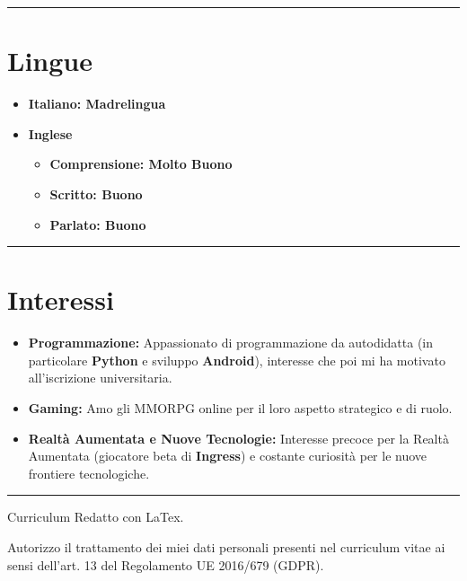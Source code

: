 \documentclass{article}
\begin{document}
\hrule

\section*{\large{Lingue}}
	\begin{itemize}
	  \item {\normalsize{\textbf{Italiano: Madrelingua}}}
	  \vspace {0.2cm}
	  \item {\normalsize{\textbf{Inglese}}}
	  \begin{itemize}
	    \item {\normalsize{\textbf{Comprensione: Molto Buono}}}
	    \item {\normalsize{\textbf{Scritto: Buono}}}
	    \item {\normalsize{\textbf{Parlato: Buono}}}
	    \end{itemize}
	\end{itemize}
	
\hrule

\section*{\large{Interessi}}
	\begin{itemize}
	\item {\normalsize{\textbf{Programmazione:} Appassionato di programmazione da autodidatta (in particolare \textbf{Python}
	e sviluppo \textbf{Android}), interesse che poi mi ha motivato all'iscrizione universitaria.}}
  	\item {\normalsize{\textbf{Gaming:} Amo gli MMORPG online per il loro aspetto strategico e di ruolo.}}
  	\item {\normalsize{\textbf{Realtà Aumentata e Nuove Tecnologie:} Interesse precoce per la Realtà Aumentata
  	(giocatore beta di \textbf{Ingress}) e costante curiosità per le nuove frontiere tecnologiche.}}
	\end{itemize}

\hrule

\vspace{0.2cm}
\normalsize
\begin{center}
Curriculum Redatto con LaTex.
\end{center}

\vspace{1cm}
\normalsize
Autorizzo il trattamento dei miei dati personali presenti nel curriculum vitae ai sensi dell’art. 13 del Regolamento UE 2016/679 (GDPR).
\end{document}
